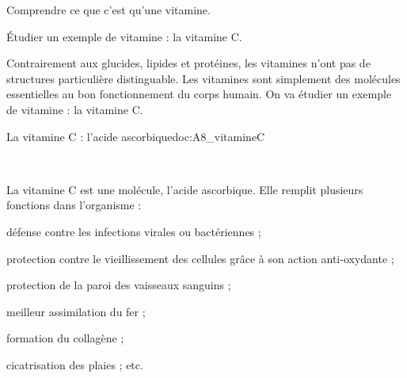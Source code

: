 \tetePremStssStru


\begin{objectifs}
  \item Comprendre ce que c'est qu'une vitamine.
  \item Étudier un exemple de vitamine : la vitamine C.
\end{objectifs}

\begin{contexte}
  Contrairement aux glucides, lipides et protéines, les vitamines n'ont pas de structures particulière distinguable.
  Les vitamines sont simplement des molécules essentielles au bon fonctionnement du corps humain.
  On va étudier un exemple de vitamine : la vitamine C.

\end{contexte}



\begin{doc}{La vitamine C : l'acide ascorbique}{doc:A8_vitamineC}
  \begin{center}
    \\[4pt]
    
  \end{center}
  La vitamine C est une molécule, l'acide ascorbique. 
  Elle remplit plusieurs fonctions dans l'organisme :
  \begin{listePoints}
    \item défense contre les infections virales ou bactériennes ;
    \item protection contre le vieillissement des cellules grâce à son action anti-oxydante ;
    \item protection de la paroi des vaisseaux sanguins ;
    \item meilleur assimilation du fer ;
    \item formation du collagène ;
    \item cicatrisation des plaies ; etc.
  \end{listePoints}
\end{doc}


